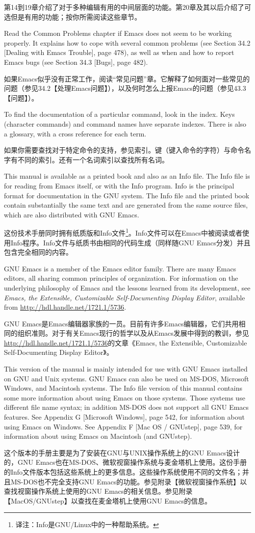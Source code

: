 第14到19章介绍了对于多种编辑有用的中间层面的功能。第20章及其以后介绍了可选但是有用的功能；按你所需阅读这些章节。\par
Read the Common Problems chapter if Emacs does not seem to be working properly. It explains how to cope with several common problems (see Section 34.2 [Dealing with Emacs Trouble], page 478), as well as when and how to report Emacs bugs (see Section 34.3 [Bugs], page 482).\par
如果Emacs似乎没有正常工作，阅读“常见问题”章。它解释了如何面对一些常见的问题（参见34.2【处理Emacs问题】），以及何时怎么上报Emacs的问题（参见43.3【问题】）。\par
To find the documentation of a particular command, look in the index. Keys (character commands) and command names have separate indexes. There is also a glossary, with a cross reference for each term.\par
如果你需要查找对于特定命令的支持，参见索引。键（键入命令的字符）与命令名字有不同的索引。还有一个名词索引以查找所有名词。\par
This manual is available as a printed book and also as an Info file. The Info file is for reading from Emacs itself, or with the Info program. Info is the principal format for documentation in the GNU system. The Info file and the printed book contain substantially the same text and are generated from the same source files, which are also distributed with GNU Emacs.\par
这份技术手册同时拥有纸质版和Info文件\footnote{译注：Info是GNU/Linux中的一种帮助系统。}。Info文件可以在Emacs中被阅读或者使用Info程序。Info文件与纸质书由相同的代码生成（同样随GNU Emacs分发）并且包含完全相同的内容。\par
GNU Emacs is a member of the Emacs editor family. There are many Emacs editors, all sharing common principles of organization. For information on the underlying philosophy of Emacs and the lessons learned from its development, see \textit{Emacs, the Extensible, Customizable Self-Documenting Display Editor}, available from \url{http://hdl.handle.net/1721.1/5736}.\par
GNU Emacs是Emacs编辑器家族的一员。目前有许多Emacs编辑器，它们共用相同的组织准则。对于有关Emacs现行的哲学以及从Emacs发展中得到的教训，参见\url{http://hdl.handle.net/1721.1/5736}的文章《Emacs, the Extensible, Customizable Self-Documenting Display Editor》。\par
This version of the manual is mainly intended for use with GNU Emacs installed on GNU and Unix systems. GNU Emacs can also be used on MS-DOS, Microsoft Windows, and Macintosh systems. The Info file version of this manual contains some more information about using Emacs on those systems. Those systems use different file name syntax; in addition MS-DOS does not support all GNU Emacs features. See Appendix G [Microsoft Windows], page 542, for information about using Emacs on Windows. See Appendix F [Mac OS / GNUstep], page 539, for information about using Emacs on Macintosh (and
GNUstep).\par
这个版本的手册主要是为了安装在GNU与UNIX操作系统上的GNU Emacs设计的，GNU Emacs也在MS-DOS、微软视窗操作系统与麦金塔机上使用。这份手册的Info文件版本包括这些系统上的更多信息。这些操作系统使用不同的文件名；并且MS-DOS也不完全支持GNU Emacs的功能。参见附录【微软视窗操作系统】以查找视窗操作系统上使用的GNU Emacs的相关信息。参见附录【MacOS/GNUstep】以查找在麦金塔机上使用GNU Emacs的信息。